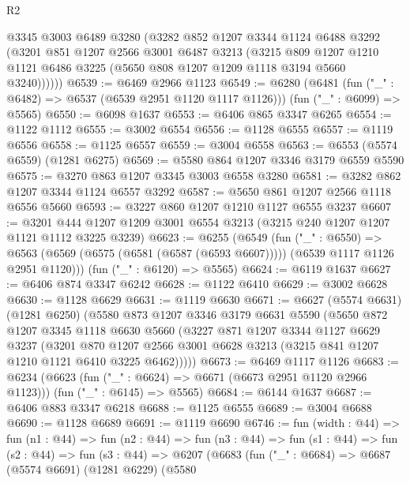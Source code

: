 \begin{lexlean}{R2}
\begin{coremodule}
        @3345
        @3003
        @6489
        @3280
        (@3282
          @852
          @1207
          @3344
          @1124
          @6488
          @3292
          (@3201
            @851
            @1207
            @2566
            @3001
            @6487
            @3213
            (@3215
              @809
              @1207
              @1210
              @1121
              @6486
              @3225
              (@5650 @808 @1207 @1209 @1118 @3194 @5660 @3240))))))
@6539 := @6469 @2966 @1123
@6549 := @6280
    (@6481 (fun ("_" : @6482) => @6537 (@6539 @2951 @1120 @1117 @1126)))
    (fun ("_" : @6099) => @5565)
@6550 := @6098 @1637
@6553 := @6406 @865 @3347 @6265
@6554 := @1122 @1112
@6555 := @3002 @6554
@6556 := @1128 @6555
@6557 := @1119 @6556
@6558 := @1125 @6557
@6559 := @3004 @6558
@6563 := @6553 (@5574 @6559) (@1281 @6275)
@6569 := @5580 @864 @1207 @3346 @3179 @6559 @5590
@6575 := @3270 @863 @1207 @3345 @3003 @6558 @3280
@6581 := @3282 @862 @1207 @3344 @1124 @6557 @3292
@6587 := @5650 @861 @1207 @2566 @1118 @6556 @5660
@6593 := @3227 @860 @1207 @1210 @1127 @6555 @3237
@6607 := @3201 @444 @1207 @1209 @3001 @6554 @3213 (@3215 @240 @1207 @1207 @1121 @1112 @3225 @3239)
@6623 := @6255
    (@6549
      (fun ("_" : @6550) =>
      @6563 (@6569 (@6575 (@6581 (@6587 (@6593 @6607))))) (@6539 @1117 @1126 @2951 @1120)))
    (fun ("_" : @6120) => @5565)
@6624 := @6119 @1637
@6627 := @6406 @874 @3347 @6242
@6628 := @1122 @6410
@6629 := @3002 @6628
@6630 := @1128 @6629
@6631 := @1119 @6630
@6671 := @6627
    (@5574 @6631)
    (@1281 @6250)
    (@5580
      @873
      @1207
      @3346
      @3179
      @6631
      @5590
      (@5650
        @872
        @1207
        @3345
        @1118
        @6630
        @5660
        (@3227
          @871
          @1207
          @3344
          @1127
          @6629
          @3237
          (@3201
            @870
            @1207
            @2566
            @3001
            @6628
            @3213
            (@3215 @841 @1207 @1210 @1121 @6410 @3225 @6462)))))
@6673 := @6469 @1117 @1126
@6683 := @6234
    (@6623 (fun ("_" : @6624) => @6671 (@6673 @2951 @1120 @2966 @1123)))
    (fun ("_" : @6145) => @5565)
@6684 := @6144 @1637
@6687 := @6406 @883 @3347 @6218
@6688 := @1125 @6555
@6689 := @3004 @6688
@6690 := @1128 @6689
@6691 := @1119 @6690
@6746 := fun (width : @44) =>
  fun (n1 : @44) =>
  fun (n2 : @44) =>
  fun (n3 : @44) =>
  fun (s1 : @44) =>
  fun (s2 : @44) =>
  fun (s3 : @44) =>
  @6207
    (@6683
      (fun ("_" : @6684) =>
      @6687
        (@5574 @6691)
        (@1281 @6229)
        (@5580

\end{coremodule}
\end{lexlean}
